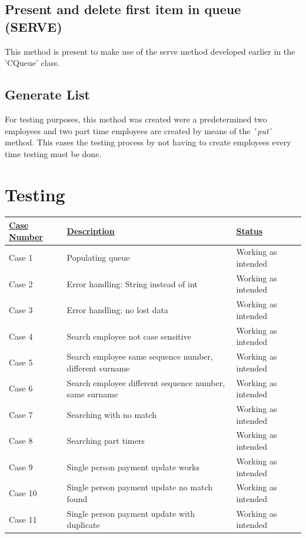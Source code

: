 \documentclass[12pt]{article}
\begin{document}
\subsection{Present and delete first item in queue (SERVE)}
This method is present to make use of the serve method developed earlier in the 'CQueue' class.

\subsection{Generate List}
For testing purposes, this method was created were a predetermined two employees and two part time employees are created by means of the ´\emph{put}´ method. This eases the testing process by not having to create employees every time testing must be done.

\newpage
\section{Testing}

\begin{tabularx}{1\textwidth} { 
  | >{\raggedright\arraybackslash}X 
  | >{\centering\arraybackslash}X 
  | >{\raggedleft\arraybackslash}X | }
 \hline
 \underline{Case Number} & \underline{Description} & \underline{Status} \\
 \hline
 Case 1  & Populating queue  & Working as intended  \\
\hline
 Case 2  & Error handling: String instead of int  & Working as intended  \\
\hline
 Case 3  & Error handling: no lost data  & Working as intended  \\
\hline
 Case 4  & Search employee not case sensitive & Working as intended  \\
\hline
 Case 5  & Search employee same sequence number, different surname  & Working as intended  \\
\hline
 Case 6 & Search employee different sequence number, same surname  & Working as intended  \\
\hline
 Case 7  & Searching with no match & Working as intended  \\
\hline
 Case 8  & Searching part timers  & Working as intended \\
\hline
 Case 9  & Single person payment update works  & Working as intended  \\
\hline
 Case 10  & Single person payment update no match found  & Working as intended  \\
\hline
 Case 11  & Single person payment update with duplicate & Working as intended  \\

\hline
\end{tabularx}
\end{document}
